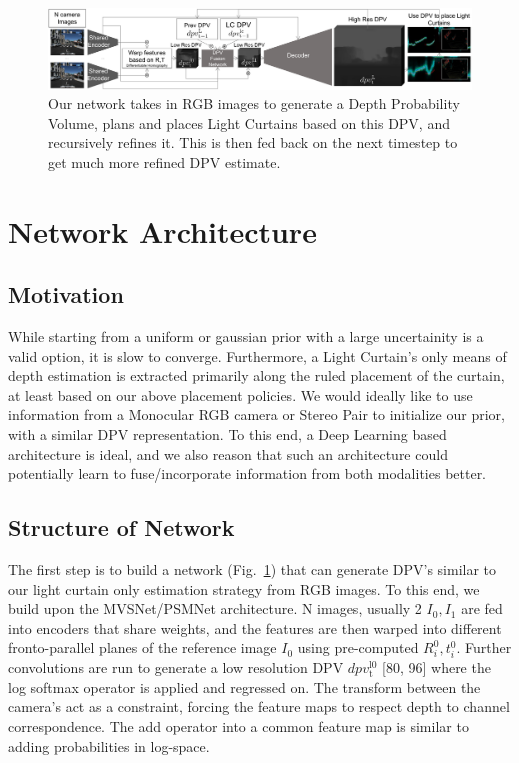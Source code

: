 \begin{figure}[t!]
   \includegraphics[width=1.0\textwidth]{figures/network.pdf}
   \caption{Our network takes in RGB images to generate a Depth Probability Volume, plans and places Light Curtains based on this DPV, and recursively refines it. This is then fed back on the next timestep to get much more refined DPV estimate. }
   \label{fig:network}
\end{figure}
   
\section{Network Architecture}

\subsection{Motivation}

While starting from a uniform or gaussian prior with a large uncertainity is a valid option, it is slow to converge. Furthermore, a Light Curtain's only means of depth estimation is extracted primarily along the ruled placement of the curtain, at least based on our above placement policies. We would ideally like to use information from a Monocular RGB camera or Stereo Pair to initialize our prior, with a similar DPV representation. To this end, a Deep Learning based architecture is ideal, and we also reason that such an architecture could potentially learn to fuse/incorporate information from both modalities better.

\subsection{Structure of Network}

The first step is to build a network (Fig.~\ref{fig:network}) that can generate DPV's similar to our light curtain only estimation strategy from RGB images. To this end, we build upon the MVSNet/PSMNet \cite{chang2018pyramid} \cite{yao2018mvsnet} architecture. N images, usually 2 $I_{0}, I_{1}$ are fed into encoders that share weights, and the features are then warped into different fronto-parallel planes of the reference image $I_{0}$ using pre-computed $R_{i}^{0}, t_{i}^{0}$. Further convolutions are run to generate a low resolution DPV $dpv_{\mathrm{t}}^{\mathrm{l0}}$ [80, 96] where the log softmax operator is applied and regressed on. The transform between the camera's act as a constraint, forcing the feature maps to respect depth to channel correspondence. The add operator into a common feature map is similar to adding probabilities in log-space. 

